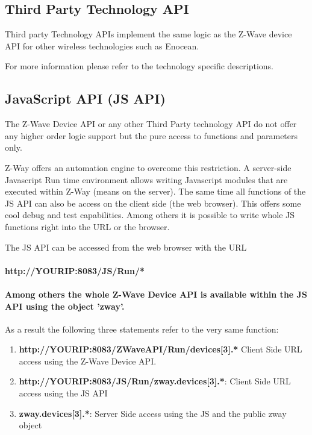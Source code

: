 \subsection{Third Party Technology API}

Third party Technology APIs implement the same logic as the Z-Wave device API for other 
wireless technologies such as Enocean.

For more information  please refer to the technology specific descriptions.

\subsection{JavaScript API (JS API)}

The Z-Wave Device API or any other Third Party technology API do 
not offer any higher order logic support but the pure access to functions and parameters 
only.

Z-Way offers an automation engine to overcome this restriction. A server-side Javascript
Run time environment allows writing Javascript modules that are executed within Z-Way 
(means on the server). The same time all functions of the JS API can also be access on 
the client side (the web browser). This offers some cool debug and test capabilities. 
Among others it is possible to write whole JS functions right into the URL or the browser.

The JS API can be accessed from the web browser with the URL

\paragraph{http://YOURIP:8083/JS/Run/*}


\paragraph{Among others the whole Z-Wave Device API is available within the JS API using 
the object 'zway'.} As a result the following three statements refer to the 
very same function:

\begin{enumerate}
\item \textbf{http://YOURIP:8083/ZWaveAPI/Run/devices[3].*} Client Side URL access using 
the Z-Wave Device API.
\item \textbf{http://YOURIP:8083/JS/Run/zway.devices[3].*}: Client Side URL access 
using the JS API
\item \textbf{zway.devices[3].*}: Server Side access using the JS and the public zway object
\end{enumerate}

